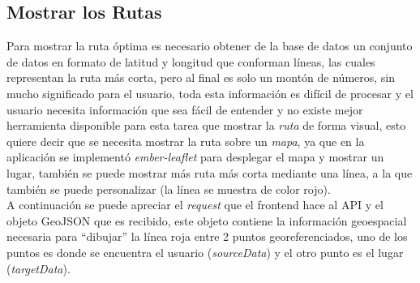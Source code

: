 %
%
%





\subsection{Mostrar los Rutas}
\label{sub:Mostrar los Rutas}

Para mostrar la ruta óptima es necesario obtener de la base de datos un conjunto de datos en formato de latitud y longitud que conforman líneas, las cuales representan la ruta más corta, pero al final es solo un montón de números, sin mucho significado para el usuario, toda esta información es difícil de procesar y el usuario necesita información que sea fácil de entender y no existe mejor herramienta disponible para esta tarea que mostrar la \emph{ruta} de forma visual, esto quiere decir que se necesita mostrar la ruta sobre un \emph{mapa}, ya que en la aplicación se implementó \emph{ember-leaflet} para desplegar el mapa y mostrar un lugar, también se puede  mostrar más ruta más corta mediante una línea, a la que también se puede personalizar (la línea se muestra de color rojo).\\

A continuación se puede apreciar el \emph{request} que el frontend hace al API y  el objeto GeoJSON que es recibido, este objeto contiene la información geoespacial necesaria para ``dibujar'' la línea roja entre 2 puntos georeferenciados, uno de los puntos es donde se encuentra el usuario (\emph{sourceData}) y el otro punto es el lugar (\emph{targetData}).


